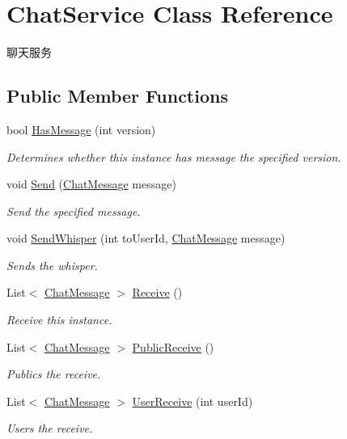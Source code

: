 \hypertarget{class_chat_service}{}\section{Chat\+Service Class Reference}
\label{class_chat_service}


聊天服务  


\subsection*{Public Member Functions}
\begin{DoxyCompactItemize}
\item 
bool \mbox{\hyperlink{class_chat_service_a21e1bdf73ddabd0703168ad24546a260}{Has\+Message}} (int version)
\begin{DoxyCompactList}\small\item\em Determines whether this instance has message the specified version. \end{DoxyCompactList}\item 
void \mbox{\hyperlink{class_chat_service_a1784ca3c6b4cd656b537d3e76bf48d52}{Send}} (\mbox{\hyperlink{class_t_net_1_1_model_1_1_chat_message}{Chat\+Message}} message)
\begin{DoxyCompactList}\small\item\em Send the specified message. \end{DoxyCompactList}\item 
void \mbox{\hyperlink{class_chat_service_a75d42d36e9f6e4ac6a301b02fb7856ca}{Send\+Whisper}} (int to\+User\+Id, \mbox{\hyperlink{class_t_net_1_1_model_1_1_chat_message}{Chat\+Message}} message)
\begin{DoxyCompactList}\small\item\em Sends the whisper. \end{DoxyCompactList}\item 
List$<$ \mbox{\hyperlink{class_t_net_1_1_model_1_1_chat_message}{Chat\+Message}} $>$ \mbox{\hyperlink{class_chat_service_acde6f5c4da12d849ba340cef90ae919a}{Receive}} ()
\begin{DoxyCompactList}\small\item\em Receive this instance. \end{DoxyCompactList}\item 
List$<$ \mbox{\hyperlink{class_t_net_1_1_model_1_1_chat_message}{Chat\+Message}} $>$ \mbox{\hyperlink{class_chat_service_a3eea8046d720ae3e84ce5c8f4dacf2c1}{Public\+Receive}} ()
\begin{DoxyCompactList}\small\item\em Publics the receive. \end{DoxyCompactList}\item 
List$<$ \mbox{\hyperlink{class_t_net_1_1_model_1_1_chat_message}{Chat\+Message}} $>$ \mbox{\hyperlink{class_chat_service_a68d1993d7a034e9f999e0d3c8d51c00c}{User\+Receive}} (int user\+Id)
\begin{DoxyCompactList}\small\item\em Users the receive. \end{DoxyCompactList}\end{DoxyCompactItemize}
